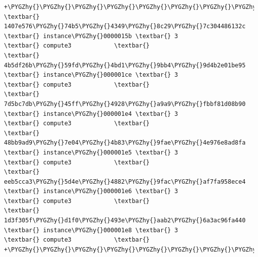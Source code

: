 \documentclass[letterpaper,10pt,english]{sphinxmanual}
\def\PYGZhy{\char`\-}
\begin{document}
\begin{enumerate}
\begin{Verbatim}[commandchars=\\\{\}]
+\PYGZhy{}\PYGZhy{}\PYGZhy{}\PYGZhy{}\PYGZhy{}\PYGZhy{}\PYGZhy{}\PYGZhy{}\PYGZhy{}\PYGZhy{}\PYGZhy{}\PYGZhy{}\PYGZhy{}\PYGZhy{}\PYGZhy{}\PYGZhy{}\PYGZhy{}\PYGZhy{}\PYGZhy{}\PYGZhy{}\PYGZhy{}\PYGZhy{}\PYGZhy{}\PYGZhy{}\PYGZhy{}\PYGZhy{}\PYGZhy{}\PYGZhy{}\PYGZhy{}\PYGZhy{}\PYGZhy{}\PYGZhy{}\PYGZhy{}\PYGZhy{}\PYGZhy{}\PYGZhy{}\PYGZhy{}\PYGZhy{}+\PYGZhy{}\PYGZhy{}\PYGZhy{}\PYGZhy{}\PYGZhy{}\PYGZhy{}\PYGZhy{}\PYGZhy{}\PYGZhy{}\PYGZhy{}\PYGZhy{}\PYGZhy{}\PYGZhy{}\PYGZhy{}\PYGZhy{}\PYGZhy{}\PYGZhy{}\PYGZhy{}\PYGZhy{}+\PYGZhy{}\PYGZhy{}\PYGZhy{}\PYGZhy{}\PYGZhy{}\PYGZhy{}\PYGZhy{}\PYGZhy{}\PYGZhy{}\PYGZhy{}\PYGZhy{}\PYGZhy{}\PYGZhy{}\PYGZhy{}\PYGZhy{}+\PYGZhy{}\PYGZhy{}\PYGZhy{}\PYGZhy{}\PYGZhy{}\PYGZhy{}\PYGZhy{}\PYGZhy{}\PYGZhy{}\PYGZhy{}\PYGZhy{}\PYGZhy{}\PYGZhy{}\PYGZhy{}\PYGZhy{}\PYGZhy{}\PYGZhy{}\PYGZhy{}\PYGZhy{}\PYGZhy{}\PYGZhy{}+
\textbar{} 1407e576\PYGZhy{}74b5\PYGZhy{}4349\PYGZhy{}8c29\PYGZhy{}7c304486132c \textbar{} instance\PYGZhy{}0000015b \textbar{} 3             \textbar{} compute3            \textbar{}
\textbar{} 4b5df26b\PYGZhy{}59fd\PYGZhy{}4bd1\PYGZhy{}9bb4\PYGZhy{}9d4b2e01be95 \textbar{} instance\PYGZhy{}000001ce \textbar{} 3             \textbar{} compute3            \textbar{}
\textbar{} 7d5bc7db\PYGZhy{}45ff\PYGZhy{}4928\PYGZhy{}a9a9\PYGZhy{}fbbf81d08b90 \textbar{} instance\PYGZhy{}000001e4 \textbar{} 3             \textbar{} compute3            \textbar{}
\textbar{} 48bb9ad9\PYGZhy{}7e04\PYGZhy{}4b83\PYGZhy{}9fae\PYGZhy{}4e976e8ad8fa \textbar{} instance\PYGZhy{}000001e5 \textbar{} 3             \textbar{} compute3            \textbar{}
\textbar{} eeb5cca3\PYGZhy{}5d4e\PYGZhy{}4882\PYGZhy{}9fac\PYGZhy{}af7fa958ece4 \textbar{} instance\PYGZhy{}000001e6 \textbar{} 3             \textbar{} compute3            \textbar{}
\textbar{} 1d3f305f\PYGZhy{}d1f0\PYGZhy{}493e\PYGZhy{}aab2\PYGZhy{}6a3ac96fa440 \textbar{} instance\PYGZhy{}000001e8 \textbar{} 3             \textbar{} compute3            \textbar{}
+\PYGZhy{}\PYGZhy{}\PYGZhy{}\PYGZhy{}\PYGZhy{}\PYGZhy{}\PYGZhy{}\PYGZhy{}\PYGZhy{}\PYGZhy{}\PYGZhy{}\PYGZhy{}\PYGZhy{}\PYGZhy{}\PYGZhy{}\PYGZhy{}\PYGZhy{}\PYGZhy{}\PYGZhy{}\PYGZhy{}\PYGZhy{}\PYGZhy{}\PYGZhy{}\PYGZhy{}\PYGZhy{}\PYGZhy{}\PYGZhy{}\PYGZhy{}\PYGZhy{}\PYGZhy{}\PYGZhy{}\PYGZhy{}\PYGZhy{}\PYGZhy{}\PYGZhy{}\PYGZhy{}\PYGZhy{}\PYGZhy{}+\PYGZhy{}\PYGZhy{}\PYGZhy{}\PYGZhy{}\PYGZhy{}\PYGZhy{}\PYGZhy{}\PYGZhy{}\PYGZhy{}\PYGZhy{}\PYGZhy{}\PYGZhy{}\PYGZhy{}\PYGZhy{}\PYGZhy{}\PYGZhy{}\PYGZhy{}\PYGZhy{}\PYGZhy{}+\PYGZhy{}\PYGZhy{}\PYGZhy{}\PYGZhy{}\PYGZhy{}\PYGZhy{}\PYGZhy{}\PYGZhy{}\PYGZhy{}\PYGZhy{}\PYGZhy{}\PYGZhy{}\PYGZhy{}\PYGZhy{}\PYGZhy{}+\PYGZhy{}\PYGZhy{}\PYGZhy{}\PYGZhy{}\PYGZhy{}\PYGZhy{}\PYGZhy{}\PYGZhy{}\PYGZhy{}\PYGZhy{}\PYGZhy{}\PYGZhy{}\PYGZhy{}\PYGZhy{}\PYGZhy{}\PYGZhy{}\PYGZhy{}\PYGZhy{}\PYGZhy{}\PYGZhy{}\PYGZhy{}+
\end{Verbatim}


\end{enumerate}
\end{document}
